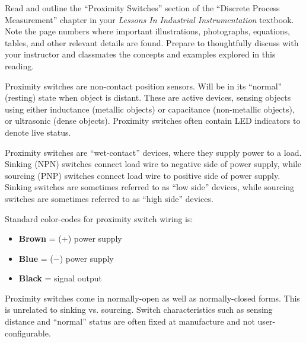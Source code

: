 

Read and outline the ``Proximity Switches'' section of the ``Discrete Process Measurement'' chapter in your {\it Lessons In Industrial Instrumentation} textbook.  Note the page numbers where important illustrations, photographs, equations, tables, and other relevant details are found.  Prepare to thoughtfully discuss with your instructor and classmates the concepts and examples explored in this reading.














Proximity switches are non-contact position sensors.  Will be in its ``normal'' (resting) state when object is distant.  These are active devices, sensing objects using either inductance (metallic objects) or capacitance (non-metallic objects), or ultrasonic (dense objects).  Proximity switches often contain LED indicators to denote live status.

\vskip 10pt

Proximity switches are ``wet-contact'' devices, where they supply power to a load.  Sinking (NPN) switches connect load wire to negative side of power supply, while sourcing (PNP) switches connect load wire to positive side of power supply.  Sinking switches are sometimes referred to as ``low side'' devices, while sourcing switches are sometimes referred to as ``high side'' devices.

Standard color-codes for proximity switch wiring is:

\begin{itemize}
\item{} {\bf Brown} = (+) power supply
\item{} {\bf Blue} = ($-$) power supply
\item{} {\bf Black} = signal output
\end{itemize}

\vskip 10pt

Proximity switches come in normally-open as well as normally-closed forms.  This is unrelated to sinking vs. sourcing.  Switch characteristics such as sensing distance and ``normal'' status are often fixed at manufacture and not user-configurable.









